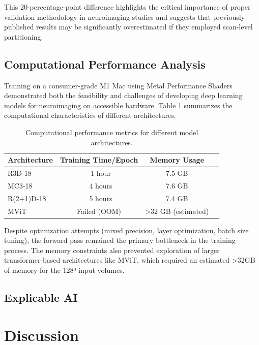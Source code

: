 \documentclass[12pt, a4paper]{article}
\begin{document}
This 20-percentage-point difference highlights the critical importance of proper validation methodology in neuroimaging studies and suggests that previously published results may be significantly overestimated if they employed scan-level partitioning.

\subsection{Computational Performance Analysis}

Training on a consumer-grade M1 Mac using Metal Performance Shaders demonstrated both the feasibility and challenges of developing deep learning models for neuroimaging on accessible hardware. Table \ref{tab:computational_performance} summarizes the computational characteristics of different architectures.

\begin{table}[htbp]
\centering
\begin{tabular}{|l|c|c|c|}
\hline
\textbf{Architecture} & \textbf{Training Time/Epoch} & \textbf{Memory Usage} \\
\hline
R3D-18 & ~1 hour & 7.5 GB \\
\hline
MC3-18 & ~4 hours & 7.6 GB \\
\hline
R(2+1)D-18 & ~5 hours & 7.4 GB \\
\hline
MViT & Failed (OOM) & >32 GB (estimated) \\
\hline
\end{tabular}
\caption{Computational performance metrics for different model architectures.}
\label{tab:computational_performance}
\end{table}

Despite optimization attempts (mixed precision, layer optimization, batch size tuning), the forward pass remained the primary bottleneck in the training process. The memory constraints also prevented exploration of larger transformer-based architectures like MViT, which required an estimated >32GB of memory for the 128³ input volumes.

\subsection{Explicable AI}

\section{Discussion}
\end{document}
